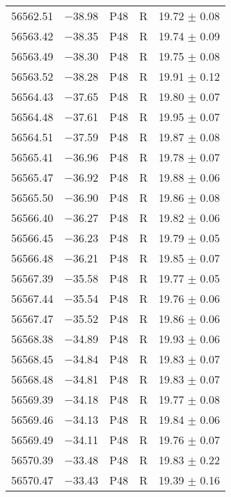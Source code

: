 \begin{tabular}{crccc}
    56562.51  &$-$38.98  &       P48  &   R  &     19.72 $\pm$ 0.08 \\
    56563.42  &$-$38.35  &       P48  &   R  &     19.74 $\pm$ 0.09 \\
    56563.49  &$-$38.30  &       P48  &   R  &     19.75 $\pm$ 0.08 \\
    56563.52  &$-$38.28  &       P48  &   R  &     19.91 $\pm$ 0.12 \\
    56564.43  &$-$37.65  &       P48  &   R  &     19.80 $\pm$ 0.07 \\
    56564.48  &$-$37.61  &       P48  &   R  &     19.95 $\pm$ 0.07 \\
    56564.51  &$-$37.59  &       P48  &   R  &     19.87 $\pm$ 0.08 \\
    56565.41  &$-$36.96  &       P48  &   R  &     19.78 $\pm$ 0.07 \\
    56565.47  &$-$36.92  &       P48  &   R  &     19.88 $\pm$ 0.06 \\
    56565.50  &$-$36.90  &       P48  &   R  &     19.86 $\pm$ 0.08 \\
    56566.40  &$-$36.27  &       P48  &   R  &     19.82 $\pm$ 0.06 \\
    56566.45  &$-$36.23  &       P48  &   R  &     19.79 $\pm$ 0.05 \\
    56566.48  &$-$36.21  &       P48  &   R  &     19.85 $\pm$ 0.07 \\
    56567.39  &$-$35.58  &       P48  &   R  &     19.77 $\pm$ 0.05 \\
    56567.44  &$-$35.54  &       P48  &   R  &     19.76 $\pm$ 0.06 \\
    56567.47  &$-$35.52  &       P48  &   R  &     19.86 $\pm$ 0.06 \\
    56568.38  &$-$34.89  &       P48  &   R  &     19.93 $\pm$ 0.06 \\
    56568.45  &$-$34.84  &       P48  &   R  &     19.83 $\pm$ 0.07 \\
    56568.48  &$-$34.81  &       P48  &   R  &     19.83 $\pm$ 0.07 \\
    56569.39  &$-$34.18  &       P48  &   R  &     19.77 $\pm$ 0.08 \\
    56569.46  &$-$34.13  &       P48  &   R  &     19.84 $\pm$ 0.06 \\
    56569.49  &$-$34.11  &       P48  &   R  &     19.76 $\pm$ 0.07 \\
    56570.39  &$-$33.48  &       P48  &   R  &     19.83 $\pm$ 0.22 \\
    56570.47  &$-$33.43  &       P48  &   R  &     19.39 $\pm$ 0.16 \\

\end{tabular}
